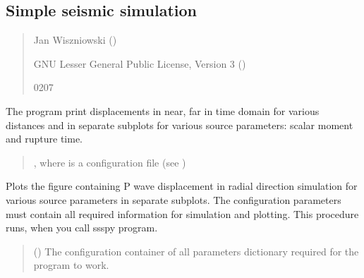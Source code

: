 \documentclass[letterpaper,10pt,english]{sphinxmanual}
\begin{document}
\subsection{Simple seismic simulation}
\label{\detokenize{api_run:simple-seismic-simulation}}\label{\detokenize{api_run:module-ssspy}}\begin{quote}\begin{description}
\sphinxAtStartPar
Jan Wiszniowski ()

\sphinxAtStartPar
GNU Lesser General Public License, Version 3
()

\sphinxhyphen{}02\sphinxhyphen{}07

\end{description}\end{quote}

\sphinxAtStartPar
The program print displacements in near, far in time domain for various distances
and in separate subplots for various source parameters: scalar moment and rupture time.
\begin{quote}\begin{description}
\sphinxAtStartPar
{}, where  is a configuration file
(see {\hyperref[\detokenize{configuration:configuration}]{}})

\end{description}\end{quote}

\begin{fulllineitems}
\label{\detokenize{api_run:ssspy.plot_simulations_radial_p}}
\pysigstartsignatures
{}
\pysigstopsignatures
\sphinxAtStartPar
Plots the figure containing P wave displacement in radial direction simulation
for various source parameters in separate subplots.
The configuration parameters must contain all required information for simulation and plotting.
This procedure runs, when you call ssspy program.
\begin{quote}\begin{description}
\sphinxAtStartPar
{} () \textendash{} The configuration container of all parameters dictionary required for the program to work.

\end{description}\end{quote}

\end{fulllineitems}
\end{document}
